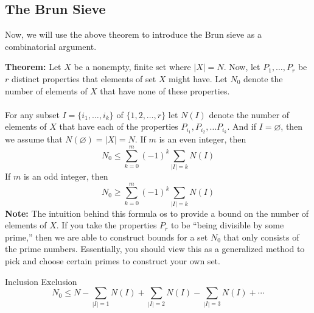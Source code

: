 \documentclass[8pt]{extarticle}
\begin{document}
\subsection{The Brun Sieve}
Now, we will use the above theorem to introduce the Brun sieve as a combinatorial argument.
\begin{boxedsection}
\textbf{Theorem:} Let $X$ be a nonempty, finite set where $|X| = N$. Now, let $P_1, \dots, P_r$ be $r$ distinct properties that elements of set $X$ might have. Let $N_0$ denote the number of elements of $X$ that have none of these properties. \\
\\
For any subset $I = \{i_1, \dots, i_k\}$ of $\{1,2,\dots, r\}$ let $N(I)$ denote the number of elements of $X$ that have each of the properties $P_{i_1}, P_{i_2}, \dots P_{i_k}$. And if $I = \varnothing$, then we assume that $N(\varnothing) = |X| = N$. If $m$ is an even integer, then
$$
N_0 \leq \sum_{k=0}^m (-1)^k \sum_{|I| = k} N(I)
$$
If $m$ is an odd integer, then 
$$
N_0 \geq \sum_{k=0}^m (-1)^k \sum_{|I| = k} N(I)
$$
\textbf{Note:} The intuition behind this formula os to provide a bound on the number of elements of $X$. If you take the properties $P_r$ to be ``being divisible by some prime,'' then we are able to construct bounds for a set $N_0$ that only consists of the prime numbers. Essentially, you should view this as a generalized method to pick and choose certain primes to construct your own set.
\end{boxedsection}
\begin{boxedsection}
    Inclusion Exclusion
$$
N_0 \leq N -  \sum_{|I| = 1} N(I) + \sum_{|I| = 2} N(I) - \sum_{|I| = 3} N(I)  + \cdots
$$
\end{boxedsection}
\end{document}
